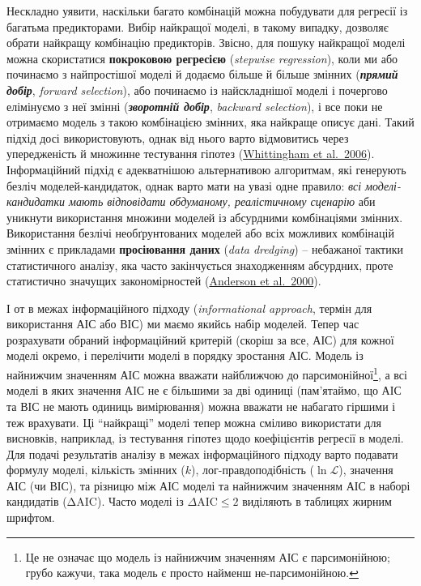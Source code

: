 \documentclass[
  11pt,
]{book}
\begin{document}
Нескладно уявити, наскільки багато комбінацій можна побудувати для регресії із багатьма предикторами. Вибір найкращої моделі, в такому випадку, дозволяє обрати найкращу комбінацію предикторів. Звісно, для пошуку найкращої моделі можна скористатися \textbf{покроковою регресією} (\emph{stepwise regression}), коли ми або починаємо з найпростішої моделі й додаємо більше й більше змінних (\textbf{\emph{прямий добір}}, \emph{forward selection}), або починаємо із найскладнішої моделі і почергово елімінуємо з неї змінні (\textbf{\emph{зворотній добір}}, \emph{backward selection}), і все поки не отримаємо модель з такою комбінацією змінних, яка найкраще описує дані. Такий підхід досі використовують, однак від нього варто відмовитись через упередженість й множинне тестування гіпотез (\href{https://doi.org/10.1111/j.1365-2656.2006.01141.x}{Whittingham et al.~2006}). Інформаційний підхід є адекватнішою альтернативою алгоритмам, які генерують безліч моделей-кандидаток, однак варто мати на увазі одне правило: \emph{всі моделі-кандидатки мають відповідати обдуманому, реалістичному сценарію} аби уникнути використання множини моделей із абсурдними комбінаціями змінних. Використання безлічі необґрунтованих моделей або всіх можливих комбінацій змінних є прикладами \textbf{просіювання даних} (\emph{data dredging}) -- небажаної тактики статистичного аналізу, яка часто закінчується знаходженням абсурдних, проте статистично значущих закономірностей (\href{https://doi.org/10.2307/3803199}{Anderson et al.~2000}).

І от в межах інформаційного підходу (\emph{informational approach}, термін для використання АІС або ВІС) ми маємо якийсь набір моделей. Тепер час розрахувати обраний інформаційний критерій (скоріш за все, АІС) для кожної моделі окремо, і перелічити моделі в порядку зростання АІС. Модель із найнижчим значенням АІС можна вважати найближчою до парсимонійної\footnote{Це не означає що модель із найнижчим значенням АІС є парсимонійною; грубо кажучи, така модель є просто найменш не-парсимонійною.}, а всі моделі в яких значення АІС не є більшими за дві одиниці (пам'ятаймо, що АІС та ВІС не мають одиниць вимірювання) можна вважати не набагато гіршими і теж врахувати. Ці ``найкращі'' моделі тепер можна сміливо використати для висновків, наприклад, із тестування гіпотез щодо коефіцієнтів регресії в моделі. Для подачі результатів аналізу в межах інформаційного підходу варто подавати формулу моделі, кількість змінних (\(k\)), лог-правдоподібність (\(\ln \mathcal{L}\)), значення АІС (чи ВІС), та різницю між АІС моделі та найнижчим значенням АІС в наборі кандидатів (ΔAIC). Часто моделі із \(\Delta \text{AIC} \leq 2\) виділяють в таблицях жирним шрифтом.
\end{document}
